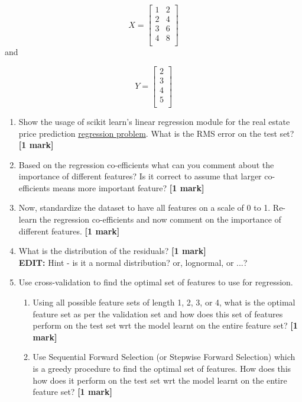 \documentclass[colorlinks,linkcolor=true]{article}
\begin{document}
$$X = \begin{bmatrix}


1       & 2 \\
2      &  4  \\
3      &  6  \\
4      &  8  \\

\end{bmatrix}$$
and 

$$Y = \begin{bmatrix}


2 \\
3  \\
4  \\
5  \\

\end{bmatrix}$$



\item  \begin{enumerate}
	

\item Show the usage of scikit learn's linear regression module for the real estate price prediction \href{https://archive.ics.uci.edu/ml/datasets/Real+estate+valuation+data+set}{regression problem}.  What is the RMS error on the test set?  \textbf{[1 mark]}

\item Based on the regression co-efficients what can you comment about the importance of different features? Is it correct to assume that larger co-efficients means more important feature?  \textbf{[1 mark]}
\item Now, standardize the dataset to have all features on a scale of 0 to 1. Re-learn the regression co-efficients and now comment on the importance of different features.  \textbf{[1 mark]}
\item What is the distribution of the residuals?  \textbf{[1 mark]} \\
\textbf{EDIT:} Hint - is it a normal distribution? or, lognormal, or ...?
\item Use cross-validation to find the optimal set of features to use for regression. 
\begin{enumerate}
	\item Using all possible feature sets of length 1, 2, 3, or 4, what is the optimal feature set as per the validation set and how does this set of features perform on the test set wrt the model learnt on the entire feature set?  \textbf{[1 mark]}
	\item Use Sequential Forward Selection (or Stepwise Forward Selection) which is a greedy procedure to find the optimal set of features. How does this how does it perform on the test set wrt the model learnt on the entire feature set?  \textbf{[1 mark]}
\end{enumerate}
\end{enumerate}
\end{document}

